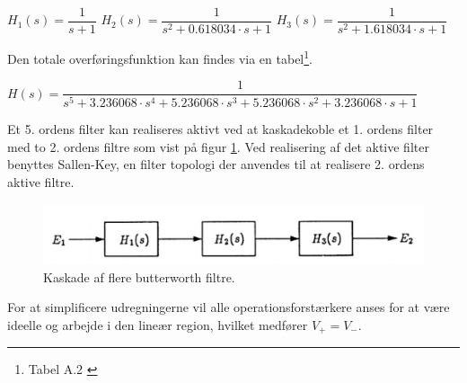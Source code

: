 \begin{center}
 $H_1(s) = \dfrac{1}{s+1}$ \hspace{1.5cm}
 $H_2(s) = \dfrac{1}{s^2 + 0.618034\cdot s + 1}$ \hspace{1.5cm}
 $H_3(s) = \dfrac{1}{s^2 + 1.618034\cdot s + 1}$
\end{center}

Den totale overføringsfunktion kan findes via en tabel\footnote{Tabel A.2 \cite[s. 378]{Su2002}}.\\ 
\begin{center}
 $H(s) = \dfrac{1}{s^5+3.236068\cdot s^4 + 5.236068\cdot s^3 + 5.236068\cdot s^2 + 3.236068\cdot s +1}$
\end{center}
Et 5. ordens filter kan realiseres aktivt ved at kaskadekoble et 1. ordens filter med to 2. ordens filtre som vist på figur  \ref{fig::anfilter_kask_butterworth}. Ved realisering af det aktive filter benyttes Sallen-Key, en filter topologi der anvendes til at realisere 2. ordens aktive filtre. 

\begin{figure}[h!]
	\centering
	\includegraphics[scale=0.7]{./billeder/Kaskade}
	\caption{Kaskade af flere butterworth filtre.}
	\label{fig::anfilter_kask_butterworth}
\end{figure}
\FloatBlock

For at simplificere udregningerne vil alle operationsforstærkere anses for at være ideelle og arbejde i den lineær region, hvilket medfører $V_+ = V_-$.

